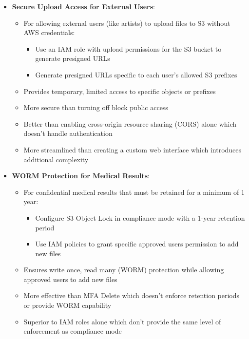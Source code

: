 \documentclass[11pt,a4paper]{report}
\begin{document}
\begin{itemize}
\begin{itemize}
  \item Aggregates metrics for multiple accounts, making it efficient for identifying buckets without versioning enabled
  \item More effective for versioning status monitoring than CloudTrail, IAM Access Analyzer, or Multi-Region Access Points
\end{itemize}
  \item \textbf{Secure Upload Access for External Users}:
\begin{itemize}
  \item For allowing external users (like artists) to upload files to S3 without AWS credentials:
\begin{itemize}
  \item Use an IAM role with upload permissions for the S3 bucket to generate presigned URLs
  \item Generate presigned URLs specific to each user's allowed S3 prefixes
\end{itemize}
  \item Provides temporary, limited access to specific objects or prefixes
  \item More secure than turning off block public access
  \item Better than enabling cross-origin resource sharing (CORS) alone which doesn't handle authentication
  \item More streamlined than creating a custom web interface which introduces additional complexity
\end{itemize}
  \item \textbf{WORM Protection for Medical Results}:
\begin{itemize}
  \item For confidential medical results that must be retained for a minimum of 1 year:
\begin{itemize}
  \item Configure S3 Object Lock in compliance mode with a 1-year retention period
  \item Use IAM policies to grant specific approved users permission to add new files
\end{itemize}
  \item Ensures write once, read many (WORM) protection while allowing approved users to add new files
  \item More effective than MFA Delete which doesn't enforce retention periods or provide WORM capability
  \item Superior to IAM roles alone which don't provide the same level of enforcement as compliance mode

\end{itemize}
\end{itemize}
\end{document}
